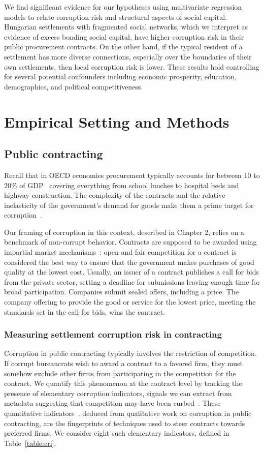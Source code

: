 We find significant evidence for our hypotheses using multivariate regression models to relate corruption risk and structural aspects of social capital. Hungarian settlements with fragmented social networks, which we interpret as evidence of excess bonding social capital, have higher corruption risk in their public procurement contracts. On the other hand, if the typical resident of a settlement has more diverse connections, especially over the boundaries of their own settlements, then local corruption risk is lower. These results hold controlling for several potential confounders including economic prosperity, education, demographics, and political competitiveness.

\section{Empirical Setting and Methods}

\subsection{Public contracting}
Recall that in OECD economies procurement typically accounts for between 10 to 20\% of GDP~\cite{oecdprocurement} covering everything from school lunches to hospital beds and highway construction. The complexity of the contracts and the relative inelasticity of the government's demand for goods make them a prime target for corruption~\cite{pwc2013}.

Our framing of corruption in this context, described in Chapter 2, relies on a benchmark of non-corrupt behavior. Contracts are supposed to be awarded using impartial market mechanisms~\cite{weber1978economy}: open and fair competition for a contract is considered the best way to ensure that the government makes purchases of good quality at the lowest cost. Usually, an issuer of a contract publishes a call for bids from the private sector, setting a deadline for submissions leaving enough time for broad participation. Companies submit sealed offers, including a price. The company offering to provide the good or service for the lowest price, meeting the standards set in the call for bids, wins the contract.

\subsubsection{Measuring settlement corruption risk in contracting}
Corruption in public contracting typically involves the restriction of competition. If corrupt bureaucrats wish to award a contract to a favored firm, they must somehow exclude other firms from participating in the competition for the contract. We quantify this phenomenon at the contract level by tracking the presence of elementary corruption indicators, signals we can extract from metadata suggesting that competition may have been curbed~\cite{fazekas2017uncovering}. These quantitative indicators~\cite{fazekas2016objective}, deduced from qualitative work on corruption in public contracting, are the fingerprints of techniques used to steer contracts towards preferred firms. We consider eight such elementary indicators, defined in Table~\ref{table:cri}.

